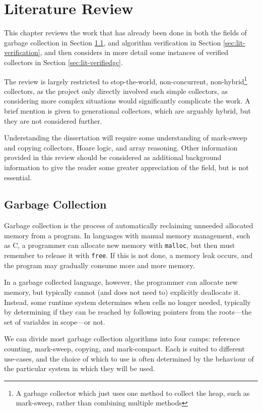 \chapter{Literature Review}
\label{sec:lit}

This chapter reviews the work that has already been done in both the
fields of garbage collection in Section \ref{sec:lit-gc}, and
algorithm verification in Section \ref{sec:lit-verification}, and then
considers in more detail some instances of verified collectors in
Section \ref{sec:lit-verifiedgc}.

The review is largely restricted to stop-the-world, non-concurrent,
non-hybrid\footnote{A garbage collector which just uses one method to
  collect the heap, such as mark-sweep, rather than combining multiple
  methods} collectors, as the project only directly involved such
simple collectors, as considering more complex situations would
significantly complicate the work. A brief mention is given to
generational collectors, which are arguably hybrid, but they are
not considered further.

Understanding the dissertation will require some understanding of
mark-sweep and copying collectors, Hoare logic, and array
reasoning. Other information provided in this review should be
considered as additional background information to give the reader
some greater appreciation of the field, but is not essential.

\section{Garbage Collection}
\label{sec:lit-gc}

Garbage collection is the process of automatically reclaiming unneeded
allocated memory from a program\cite{McCarthy60}. In languages with
manual memory management, such as C, a programmer can allocate new
memory with \texttt{malloc}, but then must remember to release it with
\texttt{free}\cite{KandR}. If this is not done, a memory leak occurs,
and the program may gradually consume more and more
memory\cite{Barach82}.

In a garbage collected language, however, the programmer can allocate
new memory, but typically cannot (and does not need to) explicitly
deallocate it. Instead, some runtime system determines when cells no
longer needed, typically by determining if they can be reached by
following pointers from the roots---the set of variables in scope---or
not.

We can divide most garbage collection algorithms into four camps:
reference counting, mark-sweep, copying, and
mark-compact\cite{GarbageCollection}. Each is suited to different
use-cases, and the choice of which to use is often determined by the
behaviour of the particular system in which they will be used.


